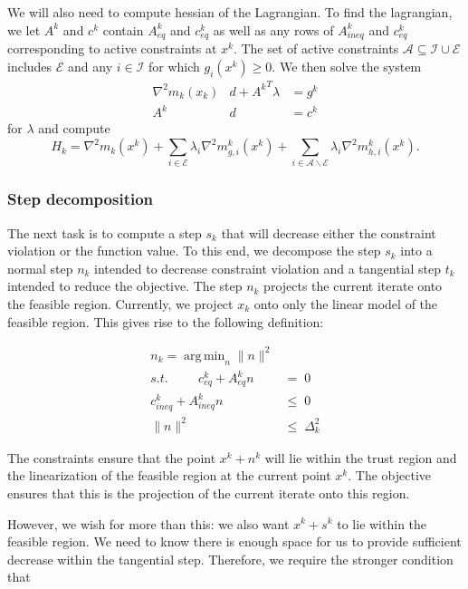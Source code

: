 \documentclass{article}
\DeclareMathOperator*{\argmin}{arg\,min}
\begin{document}
We will also need to compute hessian of the Lagrangian.
To find the lagrangian, we let $A^k$ and $c^k$ contain $A_{eq}^k$ and $c_{eq}^k$ as well as any rows of $A_{ineq}^k$ and $c_{eq}^k$ corresponding
to active constraints at $x^k$.
The set of active constraints $\mathcal A \subseteq \mathcal I \cup \mathcal E$ includes $\mathcal E$ and any $i \in \mathcal I$ for which $g_i(x^k) \ge 0$.
We then solve the system
\begin{align*}
\nabla^2m_k(x_k) & d + {A^k}^T\lambda & = g^k \\
A^k              & d                & = c^k
\end{align*}
for $\lambda$ and compute
\[
H_k = \nabla^2 m_k(x^k) 
+ \sum_{i \in \mathcal E} \lambda_i \nabla^2 m_{g,i}^k(x^k) 
+ \sum_{i \in \mathcal A \backslash \mathcal E} \lambda_i \nabla^2 m_{h,i}^k(x^k).
\]

\subsubsection{Step decomposition}
The next task is to compute a step $s_k$ that will decrease either the constraint violation or the function value. 
To this end, we decompose the step $s_k$ into a normal step $n_k$ intended to decrease constraint violation and a tangential step $t_k$ intended to reduce the objective.
The step $n_k$ projects the current iterate onto the feasible region.
Currently, we project $x_k$ onto only the linear model of the feasible region.
This gives rise to the following definition:

\begin{align*}
 n_k = \argmin_n            \|n\|^2    &\\
s.t. \hspace{1cm} c_{eq}^k + A_{eq}^kn           &=\; 0 \\
     c_{ineq}^k + A_{ineq}^kn       &\le \; 0  \\
     \| n \|^2                      &\le \; \Delta_k^2
\end{align*}

The constraints ensure that the point $x^k + n^k$ will lie within the trust region and the linearization of the feasible region at the current point $x^k$.
The objective ensures that this is the projection of the current iterate onto this region.

However, we wish for more than this: we also want $x^k + s^k$ to lie within the feasible region.
We need to know there is enough space for us to provide sufficient decrease within the tangential step.
Therefore, we require the stronger condition that
\end{document}
